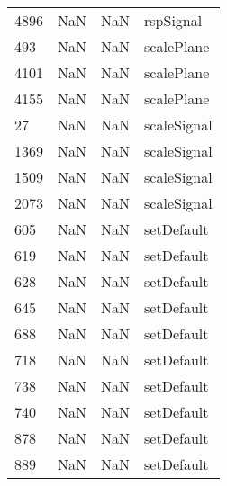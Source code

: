 \begin{tabular}{llll}
4896 &                   NaN &                        NaN &                                 rspSignal \\
493  &                   NaN &                        NaN &                                scalePlane \\
4101 &                   NaN &                        NaN &                                scalePlane \\
4155 &                   NaN &                        NaN &                                scalePlane \\
27   &                   NaN &                        NaN &                               scaleSignal \\
1369 &                   NaN &                        NaN &                               scaleSignal \\
1509 &                   NaN &                        NaN &                               scaleSignal \\
2073 &                   NaN &                        NaN &                               scaleSignal \\
605  &                   NaN &                        NaN &                                setDefault \\
619  &                   NaN &                        NaN &                                setDefault \\
628  &                   NaN &                        NaN &                                setDefault \\
645  &                   NaN &                        NaN &                                setDefault \\
688  &                   NaN &                        NaN &                                setDefault \\
718  &                   NaN &                        NaN &                                setDefault \\
738  &                   NaN &                        NaN &                                setDefault \\
740  &                   NaN &                        NaN &                                setDefault \\
878  &                   NaN &                        NaN &                                setDefault \\
889  &                   NaN &                        NaN &                                setDefault \\

\end{tabular}
